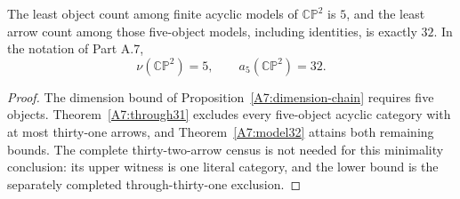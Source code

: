 \begin{corollary}[Proved]\label{A7:exact-object-and-arrow-minima}
The least object count among finite acyclic models of
$\mathbb{CP}^2$ is $5$, and the least arrow count among those
five-object models, including identities, is exactly $32$.
In the notation of Part A.7,
\[
 \boxed{\nu(\mathbb{CP}^2)=5,\qquad a_5(\mathbb{CP}^2)=32.}
\]
\end{corollary}
\begin{proof}
The dimension bound of Proposition~\ref{A7:dimension-chain}
requires five objects. Theorem~\ref{A7:through31} excludes every
five-object acyclic category with at most thirty-one arrows,
and Theorem~\ref{A7:model32} attains both remaining bounds.
The complete thirty-two-arrow census is not needed for this
minimality conclusion: its upper witness is one literal category,
and the lower bound is the separately completed through-thirty-one
exclusion.
\end{proof}
